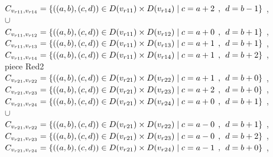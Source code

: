 \\$C_{v_{r11},v_{r14}}=\{((a,b),(c,d))\in D(v_{r11}) \times D(v_{r14})\mid c = a + 2\hspace{1ex} , \hspace{1ex}  d = b - 1 \}$ , 
\\$\cup$
\\$C_{v_{r11},v_{r12}}=\{((a,b),(c,d))\in D(v_{r11}) \times D(v_{r12})\mid c = a + 0\hspace{1ex} , \hspace{1ex}  d = b + 1 \}$ , 
\\$C_{v_{r11},v_{r13}}=\{((a,b),(c,d))\in D(v_{r11}) \times D(v_{r13})\mid c = a + 1\hspace{1ex} , \hspace{1ex}  d = b + 1 \}$ , 
\\$C_{v_{r11},v_{r14}}=\{((a,b),(c,d))\in D(v_{r11}) \times D(v_{r14})\mid c = a + 1\hspace{1ex} , \hspace{1ex}  d = b + 2 \}$ , 
\\ piece Red2 
\\$C_{v_{r21},v_{r22}}=\{((a,b),(c,d))\in D(v_{r21}) \times D(v_{r22})\mid c = a + 1\hspace{1ex} , \hspace{1ex}  d = b + 0 \}$ , 
\\$C_{v_{r21},v_{r23}}=\{((a,b),(c,d))\in D(v_{r21}) \times D(v_{r23})\mid c = a + 2\hspace{1ex} , \hspace{1ex}  d = b + 0 \}$ , 
\\$C_{v_{r21},v_{r24}}=\{((a,b),(c,d))\in D(v_{r21}) \times D(v_{r24})\mid c = a + 0\hspace{1ex} , \hspace{1ex}  d = b + 1 \}$ , 
\\$\cup$
\\$C_{v_{r21},v_{r22}}=\{((a,b),(c,d))\in D(v_{r21}) \times D(v_{r22})\mid c = a - 0\hspace{1ex} , \hspace{1ex}  d = b + 1 \}$ , 
\\$C_{v_{r21},v_{r23}}=\{((a,b),(c,d))\in D(v_{r21}) \times D(v_{r23})\mid c = a - 0\hspace{1ex} , \hspace{1ex}  d = b + 2 \}$ , 
\\$C_{v_{r21},v_{r24}}=\{((a,b),(c,d))\in D(v_{r21}) \times D(v_{r24})\mid c = a - 1\hspace{1ex} , \hspace{1ex}  d = b + 0 \}$ , 
